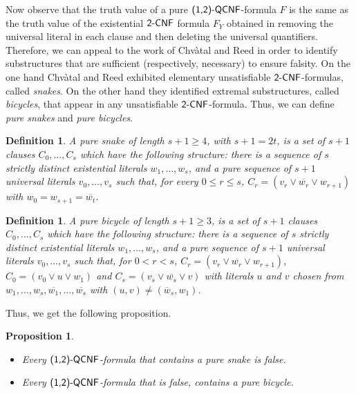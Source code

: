 \documentclass[aop,noinfoline]{imsart}
\newtheorem{proposition}[theorem]{Proposition}
\newtheorem{definition}[theorem]{Definition}
\newcommand{\onetwo}{(1,2)}
\newcommand{\negate}[1]{\overline{#1}}
\newcommand{\onetwoqcnf}{\mbox{\sf \onetwo-QCNF}}
\newcommand{\twocnf}{\mbox{\sf 2-CNF}}
\begin{document}
Now observe that the truth value of a pure  $\onetwoqcnf$-formula $F$ is the same as the truth value of the existential $\twocnf$ formula $F_Y$ obtained in removing the universal literal in each clause and then deleting the universal quantifiers. Therefore, we can appeal to the work of Chv\`atal and Reed \cite{ChvatalR-92} in order to identify substructures that are sufficient (respectively, necessary) to ensure falsity.
On the one hand Chv\`atal and Reed exhibited elementary unsatisfiable $\twocnf$-formulas, called \emph{snakes}. On the other hand they identified extremal substructures, called \emph{bicycles}, that appear  in any unsatisfiable $\twocnf$-formula. Thus, we can define \emph{ pure snakes} and \emph{pure bicycles}.
\begin{definition}
  A pure \emph{snake}  of length $s+1\geq 4$, with $s+1=2t$,  is a set
  of  $s+1$ clauses $C_0,\ldots, C_s$ which have the following
  structure: there is a sequence of  
 $s$
strictly distinct existential literals $w_1, \ldots, w_s$, and a pure sequence of $s+1$ universal literals $v_0, \ldots, v_s$  such
that, for every $0\le r\le s$, $C_r=(v_r\lor \negate{w_r}\lor w_{r+1})$ with $w_0=w_{s+1}=\negate{w_t}$.
\end{definition}

\begin{definition}
  A \emph{ pure bicycle} of length $s+1\geq 3$, is a set of  $s+1$ clauses $C_0,\ldots, C_s$ which have the following structure:
there is a sequence of  $s$
strictly distinct existential literals $w_1, \ldots, w_s$, and a pure sequence of $s+1$ universal literals $v_0, \ldots, v_s$  such
that, for  $0 < r <  s$, $C_r=(v_r\lor \negate{w_r}\lor w_{r+1})$, $C_0=(v_0\lor u\lor w_{1})$ and $C_s=(v_s\lor \negate{w_s}\lor v)$  with literals $u$ and $v$ chosen from $w_1,
\ldots, w_s, \negate{w_1}, \ldots,\negate{w_s}$ with $(u,v)\not
=(\negate{w}_s,w_1)$. 
\end{definition}

Thus, we get the following proposition.
\begin{proposition}\label{prop:certificates}\ 

 \begin{itemize}
 \item Every $\onetwoqcnf$-formula that contains a pure snake is false.
\item Every   $\onetwoqcnf$-formula that is false, contains a pure bicycle.
\end{itemize}
\end{proposition}
\end{document}
